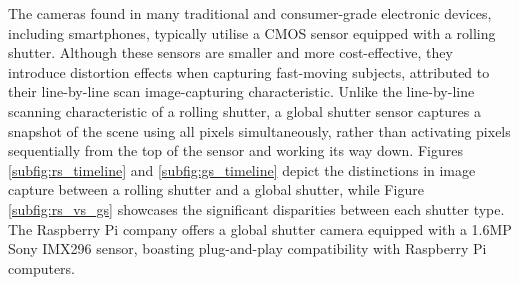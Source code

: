 The cameras found in many traditional and consumer-grade electronic devices, including smartphones, typically utilise a CMOS sensor equipped with a rolling shutter. Although these sensors are smaller and more cost-effective, they introduce distortion effects when capturing fast-moving subjects, attributed to their line-by-line scan image-capturing characteristic. Unlike the line-by-line scanning characteristic of a rolling shutter, a global shutter sensor captures a snapshot of the scene using all pixels simultaneously, rather than activating pixels sequentially from the top of the sensor and working its way down. Figures \ref{subfig:rs_timeline} and \ref{subfig:gs_timeline} depict the distinctions in image capture between a rolling shutter and a global shutter, while Figure \ref{subfig:rs_vs_gs} showcases the significant disparities between each shutter type. The Raspberry Pi company offers a global shutter camera equipped with a 1.6MP Sony IMX296 sensor, boasting plug-and-play compatibility with Raspberry Pi computers.

